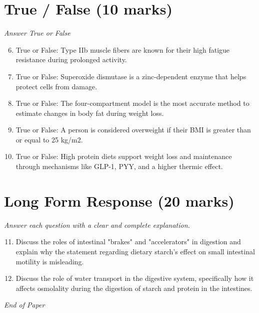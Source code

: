 \documentclass[12pt]{article}
\begin{document}
\section*{True / False (10 marks)}
\textit{Answer True or False}
\begin{enumerate}[label=\arabic*.]
\setcounter{enumi}{5}
\item True or False: Type IIb muscle fibers are known for their high fatigue resistance during prolonged activity.
\item True or False: Superoxide dismutase is a zinc-dependent enzyme that helps protect cells from damage.
\item True or False: The four-compartment model is the most accurate method to estimate changes in body fat during weight loss.
\item True or False: A person is considered overweight if their BMI is greater than or equal to 25 kg/m2.
\item True or False: High protein diets support weight loss and maintenance through mechanisms like GLP-1, PYY, and a higher thermic effect.
\end{enumerate}

\section*{Long Form Response (20 marks)}
\textit{Answer each question with a clear and complete explanation.}
\begin{enumerate}[label=\arabic*.]
\setcounter{enumi}{10}
\item Discuss the roles of intestinal "brakes" and "accelerators" in digestion and explain why
the statement regarding dietary starch's effect on small intestinal motility is
misleading.
\item Discuss the role of water transport in the digestive system, specifically how it affects
osmolality during the digestion of starch and protein in the intestines.
\end{enumerate}

\vfill
\noindent\textit{End of Paper}
\end{document}
